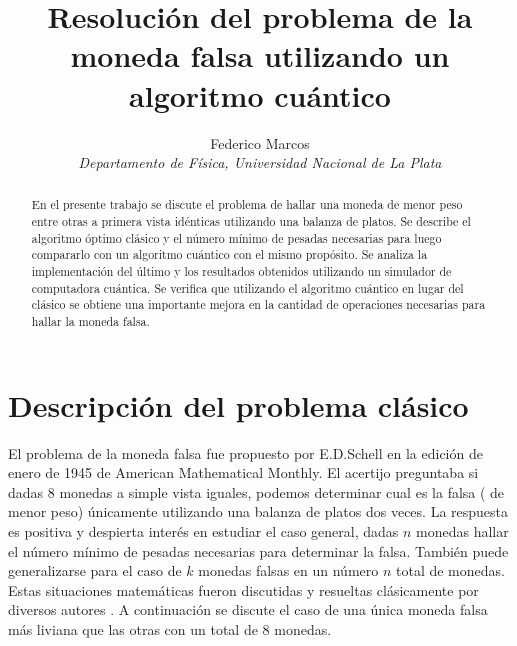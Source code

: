 \documentclass{article}
\begin{document}
\title{Resolución del problema de la moneda falsa utilizando un algoritmo cuántico}
\author{Federico Marcos\\
\normalsize\it Departamento de Física, Universidad Nacional de La Plata}
\date{}
\maketitle

\begin{abstract}
En el presente trabajo se discute el problema de hallar una moneda de menor peso entre otras a primera vista idénticas utilizando una balanza de platos.
Se describe el algoritmo óptimo clásico y el número mínimo de pesadas necesarias para luego compararlo con un algoritmo cuántico con el mismo propósito. Se analiza la implementación del último y los resultados obtenidos utilizando un simulador de computadora cuántica. Se verifica que utilizando el algoritmo cuántico en lugar del clásico se obtiene una importante mejora en la cantidad de operaciones necesarias para hallar la moneda falsa.
\end{abstract}



\section*{Descripción del problema clásico}

El problema de la moneda falsa  fue propuesto por E.D.Schell en la edición de enero de 1945  de American Mathematical Monthly. El acertijo preguntaba si dadas 8 monedas a simple vista iguales, podemos determinar cual es la falsa ( de menor peso) únicamente utilizando una balanza de platos dos veces.
La respuesta es positiva  y despierta interés en estudiar el caso general, dadas $n$ monedas hallar el número mínimo de pesadas necesarias para determinar la falsa. También puede generalizarse para el caso de $k$ monedas falsas en un número $n$ total de monedas. Estas situaciones matemáticas fueron discutidas y resueltas clásicamente por diversos autores \cite{1}.  A continuación se discute el caso de una única moneda falsa más liviana que las otras con un total de 8 monedas.
\end{document}
